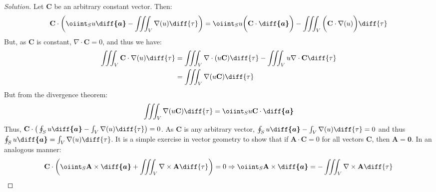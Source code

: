 \documentclass[crop=false,class=book,oneside]{standalone}
\begin{document}
            \begin{proof}[Solution]
                Let $\mathbf{C}$ be an arbitrary constant vector. Then:
                \begin{equation*}
                    \mathbf{C}\cdot\bigg(
                        \oiint_{S}u\boldsymbol{\diff{a}}
                        -\iiint_{V}\nabla(u)\diff{\tau}
                    \bigg)
                    =\oiint_{S}u\bigg(
                        \mathbf{C}\cdot\boldsymbol{\diff{a}}
                    \bigg)
                    -\iiint_{V}\bigg(
                        \mathbf{C}\cdot\nabla(u)
                    \bigg)\diff{\tau}
                \end{equation*}
                But, as $\mathbf{C}$ is constant,
                $\nabla\cdot\mathbf{C}=0$, and thus we have:
                \begin{align*}
                    \iiint_{V}\mathbf{C}\cdot\nabla(u)\diff{\tau}
                    &=\iiint_{V}\nabla\cdot(u\mathbf{C})\diff{\tau}
                    -\iiint_{V}u\nabla\cdot\mathbf{C}\diff{\tau}\\
                    &=\iiint_{V}\nabla(u\mathbf{C})\diff{\tau}
                \end{align*}
                But from the divergence theorem:
                \begin{equation*}
                    \iiint_{V}\nabla(u\mathbf{C})\diff{\tau}
                    =\oiint_{S}u\mathbf{C}\cdot\boldsymbol{\diff{a}}
                \end{equation*}
                Thus,
                $\mathbf{C}\cdot\big(%
                     \oint_{S}u\boldsymbol{\diff{a}}%
                     -\int_{V}\nabla(u)\diff{\tau}%
                \big)=0$.
                As $\mathbf{C}$ is any arbitrary vector,
                $\oint_{S}u\boldsymbol{\diff{a}}%
                 -\int_{V}\nabla(u)\diff{\tau}=0$
                and thus
                $\oint_{S}u\boldsymbol{\diff{a}}%
                 =\int_{V}\nabla(u)\diff{\tau}$.
                It is a simple exercise in vector geometry
                to show that if $\mathbf{A}\cdot\mathbf{C}=0$
                for all vectors $\mathbf{C}$, then
                $\mathbf{A}=\mathbf{0}$. In an analogous manner:
                \begin{align*}
                    \mathbf{C}\cdot\bigg(
                        \oiint_{S}\mathbf{A}\times\boldsymbol{\diff{a}}
                        +\iiint_{V}\nabla\times\mathbf{A}\diff{\tau}
                    \bigg)
                    =0\Rightarrow\oiint_{S}
                    \mathbf{A}\times\boldsymbol{\diff{a}}
                    =-\iiint_{V}\nabla\times\mathbf{A}\diff{\tau}
                \end{align*}
            \end{proof}
\end{document}
